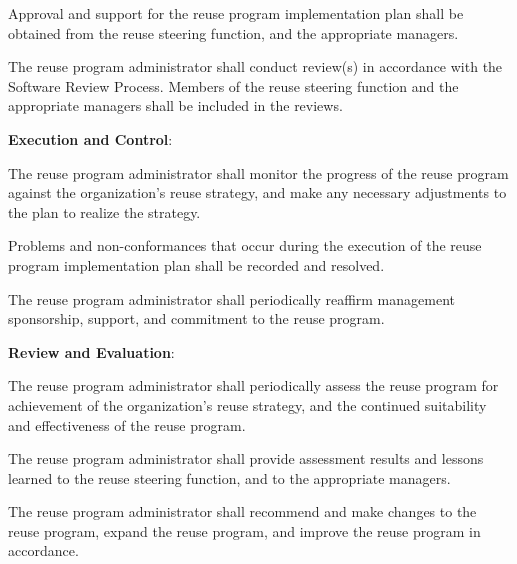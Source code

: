 \begin{adjustwidth}{2em}{0pt}
\begin{compactenum}
\begin{compactenum}
						\item Approval and support for the reuse program implementation plan shall be obtained from the reuse steering function, and the appropriate managers.

						\item The reuse program administrator shall conduct review(s) in accordance with the Software Review Process. Members of the reuse steering function and the appropriate managers shall be included in the reviews.

					\end{compactenum}

					\item {\bf Execution and Control}:

					\begin{compactenum}

						\item The reuse program administrator shall monitor the progress of the reuse program against the organization’s reuse strategy, and make any necessary adjustments to the plan to realize the strategy.

						\item Problems and non-conformances that occur during the execution of the reuse program implementation plan shall be recorded and resolved.

						\item The reuse program administrator shall periodically reaffirm management sponsorship, support, and commitment to the reuse program.

					\end{compactenum}

					\item {\bf Review and Evaluation}:

					\begin{compactenum}

						\item The reuse program administrator shall periodically assess the reuse program for achievement of the organization’s reuse strategy, and the continued suitability and effectiveness of the reuse program.

						\item The reuse program administrator shall provide assessment results and lessons learned to the reuse steering function, and to the appropriate managers.

						\item The reuse program administrator shall recommend and make changes to the reuse program, expand the reuse program, and improve the reuse program in accordance.

					\end{compactenum}

				\end{compactenum}

			\end{adjustwidth}